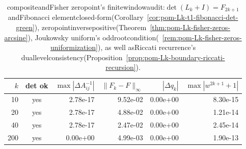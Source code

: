 \begin{table}[H]
\centering
\scriptsize
\setlength{\tabcolsep}{6pt}
\caption{compositeandFisher zeropoint's finitewindowaudit:$\det(L_k+I)=F_{2k+1}$ andFibonacci elementclosed-form(Corollary~\ref{cor:pom-Lk-t1-fibonacci-det-green}), zeropointinversepositive(Theorem~\ref{thm:pom-Lk-fisher-zeros-arcsine}), Joukowsky uniform's oddrootcondition(~\ref{rem:pom-Lk-fisher-zeros-uniformization}), as well asRiccati recurrence's duallevelconsistency(Proposition~\ref{prop:pom-Lk-boundary-riccati-recursion}). }
\label{tab:fence_green_kernel_golden_coupling_audit}
\begin{tabular}{r c r r r r}
\toprule
$k$ & det ok & $\max|\Delta A^{-1}_{ij}|$ & $\|F_k-F\|_\infty$ & $|\Delta q_k|$ & $\max|w^{2k+1}+1|$\\
\midrule
10 & yes & 2.78e-17 & 9.52e-02 & 0.00e+00 & 8.30e-15\\
20 & yes & 2.78e-17 & 4.88e-02 & 0.00e+00 & 1.21e-14\\
40 & yes & 2.78e-17 & 2.47e-02 & 0.00e+00 & 2.45e-14\\
200 & yes & 0.00e+00 & 4.99e-03 & 0.00e+00 & 1.90e-13\\
\bottomrule
\end{tabular}
\end{table}
